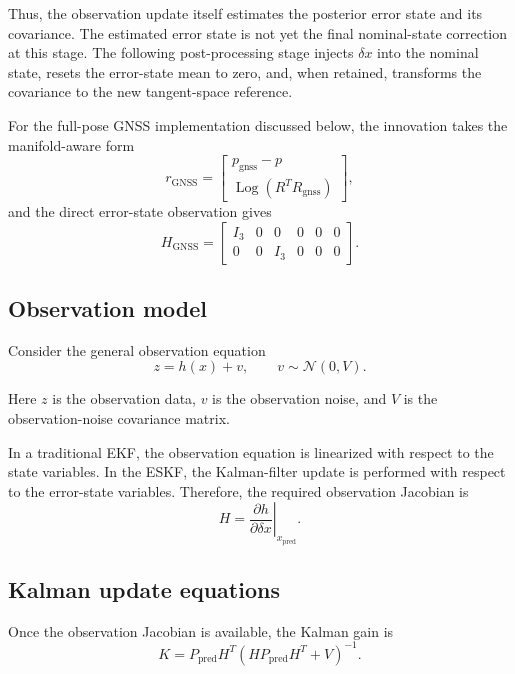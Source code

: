 \documentclass[11pt]{article}
\numberwithin{equation}{section}
\newcommand{\Log}{\operatorname{Log}}
\begin{document}
Thus, the observation update itself estimates the posterior error state
and its covariance.  The estimated error state is not yet the final
nominal-state correction at this stage.  The following post-processing
stage injects $\delta x$ into the nominal state, resets the error-state
mean to zero, and, when retained, transforms the covariance to the new
tangent-space reference.

For the full-pose GNSS implementation discussed below, the innovation
takes the manifold-aware form
\[
r_{\mathrm{GNSS}}
=
\begin{bmatrix}
p_{\mathrm{gnss}}-p\\
\Log(R^TR_{\mathrm{gnss}})
\end{bmatrix},
\]
and the direct error-state observation gives
\[
H_{\mathrm{GNSS}}
=
\begin{bmatrix}
I_3&0&0&0&0&0\\
0&0&I_3&0&0&0
\end{bmatrix}.
\]


\subsection{Observation model}

Consider the general observation equation
\begin{equation}
\boxed{
z=h(x)+v,
\qquad
v\sim\mathcal N(0,V).
}
\end{equation}

Here $z$ is the observation data, $v$ is the observation noise, and
$V$ is the observation-noise covariance matrix.

In a traditional EKF, the observation equation is linearized with
respect to the state variables. In the ESKF, the Kalman-filter update
is performed with respect to the error-state variables. Therefore, the
required observation Jacobian is
\begin{equation}
\boxed{
H
=
\left.
\frac{\partial h}{\partial\delta x}
\right|_{x_{\mathrm{pred}}}.
}
\end{equation}

\subsection{Kalman update equations}

Once the observation Jacobian is available, the Kalman gain is
\begin{equation}
\boxed{
K
=
P_{\mathrm{pred}}H^T
\left(
HP_{\mathrm{pred}}H^T+V
\right)^{-1}.
}
\end{equation}
\end{document}
